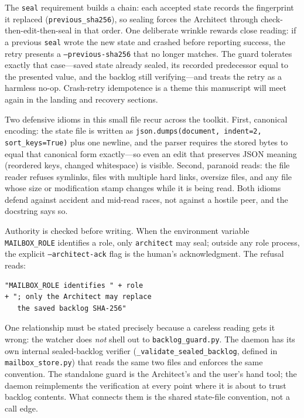 \documentclass[10pt,aps,prd,twocolumn,nofootinbib]{revtex4-2}
\newcommand{\code}[1]{\texttt{#1}}
\newcommand{\file}[1]{\texttt{#1}}
\begin{document}
The \code{seal} requirement builds a chain: each accepted state records
the fingerprint it replaced (\code{previous\_sha256}), so sealing
forces the Architect through check-then-edit-then-seal in that order.
One deliberate wrinkle rewards close reading: if a previous \code{seal}
wrote the new state and crashed before reporting success, the retry
presents a \code{--previous-sha256} that no longer matches.  The guard
tolerates exactly that case---saved state already sealed, its recorded
predecessor equal to the presented value, and the backlog still
verifying---and treats the retry as a harmless no-op.  Crash-retry
idempotence is a theme this manuscript will meet again in the landing
and recovery sections.

Two defensive idioms in this small file recur across the toolkit.
First, canonical encoding: the state file is written as
\code{json.dumps(document, indent=2, sort\_keys=True)} plus one
newline, and the parser requires the stored bytes to equal that
canonical form exactly---so even an edit that preserves JSON meaning
(reordered keys, changed whitespace) is visible.  Second, paranoid
reads: the file reader refuses symlinks, files with multiple hard
links, oversize files, and any file whose size or modification stamp
changes while it is being read.  Both idioms defend against accident
and mid-read races, not against a hostile peer, and the docstring says
so.

Authority is checked before writing.  When the environment variable
\code{MAILBOX\_ROLE} identifies a role, only \code{architect} may seal;
outside any role process, the explicit \code{--architect-ack} flag is
the human's acknowledgment.  The refusal reads:
\begin{verbatim}
"MAILBOX_ROLE identifies " + role
+ "; only the Architect may replace
   the saved backlog SHA-256"
\end{verbatim}

One relationship must be stated precisely because a careless reading
gets it wrong: the watcher does \emph{not} shell out to
\file{backlog\_guard.py}.  The daemon has its own internal sealed-backlog
verifier (\code{\_validate\_sealed\_backlog}, defined in
\file{mailbox\_store.py}) that reads the same two files and enforces
the same convention.  The standalone guard is the Architect's and the
user's hand tool; the daemon reimplements the verification at every
point where it is about to trust backlog contents.  What connects them
is the shared state-file convention, not a call edge.
\end{document}
